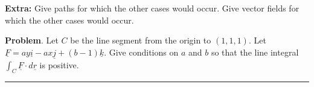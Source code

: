 \documentclass[12pt,letterpaper,noanswers]{exam}
\newcommand{\mb}[1]{\underline{#1}}
\begin{document}
\textbf{Extra:} Give paths for which the other cases would occur.  Give vector fields for which the other cases would occur.

\vfill

\eject




\noindent\textbf{Problem}.  Let $C$ be the line segment from the origin to $(1,1,1)$.  Let $\mb F = ay\mb i -ax\mb j + (b-1)\mb k$.  Give conditions on $a$ and $b$ so that the line integral $\int_C \mb F\cdot d\mb r$ is positive.
\vfill


\vspace{0.2cm}
\hrule
\vspace{0.2cm}
\end{document}
